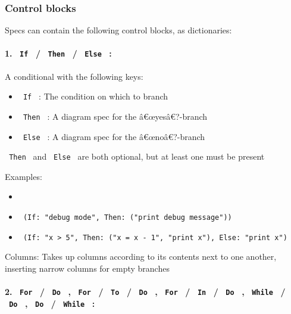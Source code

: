 \subsubsection{Control blocks}\label{control-blocks}

Specs can contain the following control blocks, as dictionaries:

\paragraph{\texorpdfstring{1. \texttt{\ If\ } / \texttt{\ Then\ } /
\texttt{\ Else\ } :}{1.  If  /  Then  /  Else  :}}\label{if-then-else}

A conditional with the following keys:

\begin{itemize}
\tightlist
\item
  \texttt{\ If\ } : The condition on which to branch
\item
  \texttt{\ Then\ } : A diagram spec for the â€œyesâ€?-branch
\item
  \texttt{\ Else\ } : A diagram spec for the â€œnoâ€?-branch
\end{itemize}

\texttt{\ Then\ } and \texttt{\ Else\ } are both optional, but at least
one must be present

Examples:

\begin{itemize}
\tightlist
\item
\item
  \texttt{\ (If:\ "debug\ mode",\ Then:\ ("print\ debug\ message"))\ }

  \pandocbounded{}
\item
  \texttt{\ (If:\ "x\ \textgreater{}\ 5",\ Then:\ ("x\ =\ x\ -\ 1",\ "print\ x"),\ Else:\ "print\ x")\ }

  \pandocbounded{}
\end{itemize}

Columns: Takes up columns according to its contents next to one another,
inserting narrow columns for empty branches

\paragraph{\texorpdfstring{2. \texttt{\ For\ } / \texttt{\ Do\ } ,
\texttt{\ For\ } / \texttt{\ To\ } / \texttt{\ Do\ } , \texttt{\ For\ }
/ \texttt{\ In\ } / \texttt{\ Do\ } , \texttt{\ While\ } /
\texttt{\ Do\ } , \texttt{\ Do\ } / \texttt{\ While\ }
:}{2.  For  /  Do  ,  For  /  To  /  Do  ,  For  /  In  /  Do  ,  While  /  Do  ,  Do  /  While  :}}\label{for-do-for-to-do-for-in-do-while-do-do-while}

